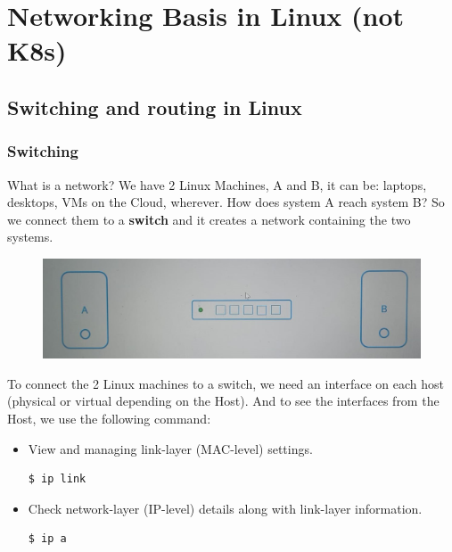 \documentclass{article}
\newenvironment{codetemplate}[1][]{%
  \mybasecolorbox[#1]
  \itshape
}{%
  \endmybasecolorbox
}
\begin{document}
\newpage
\section{Networking Basis in Linux (not K8s)}

\subsection{Switching and routing in Linux}
\label{swrt}

\subsubsection{Switching}

What is a network? We have 2 Linux Machines, A and B, it can be: laptops, desktops, VMs on the Cloud, wherever. How does system A reach system B? So we connect them to a \textbf{switch} and it creates a network containing the two systems. 

\begin{figure}[H]
    \includegraphics[width=\textwidth]{pictures/ntw.jpg}
\end{figure}

To connect the 2 Linux machines to a switch, we need an interface on each host (physical or virtual depending on the Host). And to see the interfaces from the Host, we use the following command:

\begin{itemize}
    \item View and managing link-layer (MAC-level) settings.
\begin{codetemplate}{}
\begin{verbatim}
$ ip link
\end{verbatim}
\end{codetemplate}

    \item Check network-layer (IP-level) details along with link-layer information.
\begin{codetemplate}{}
\begin{verbatim}
$ ip a
\end{verbatim}
\end{codetemplate}
\end{itemize}
\end{document}
